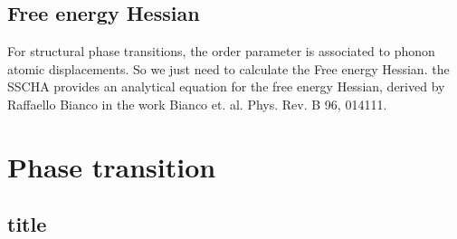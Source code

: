 \documentclass[]{report}
\begin{document}
\subsection{Free energy Hessian}
For structural phase transitions, the order parameter is associated to phonon atomic displacements. So we just need to calculate the Free energy Hessian. the SSCHA provides an analytical equation for the free energy Hessian, derived by Raffaello Bianco in the work Bianco et. al. Phys. Rev. B 96, 014111. 
\section{Phase transition}
\subsection{title}
\end{document}
